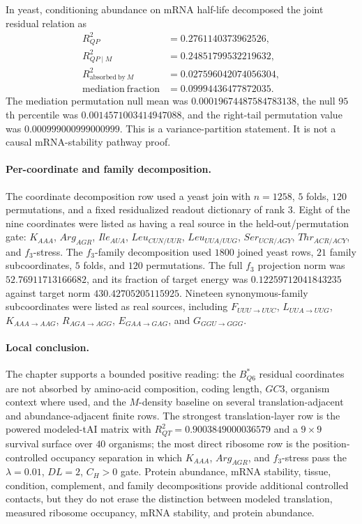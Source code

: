 In yeast, conditioning abundance on mRNA half-life decomposed the joint residual relation as
$$
\begin{aligned}
R^2_{QP} &= 0.2761140373962526,\\
R^2_{QP\mid M} &= 0.24851799532219632,\\
R^2_{\mathrm{absorbed\ by}\ M} &= 0.027596042074056304,\\
\mathrm{mediation\ fraction} &= 0.09994436477872035.
\end{aligned}
$$
The mediation permutation null mean was $0.00019674487584783138$, the null $95$th percentile was $0.0014571003414947088$, and the right-tail permutation value was $0.000999000999000999$.  This is a variance-partition statement.  It is not a causal mRNA-stability pathway proof.

\paragraph{Per-coordinate and family decomposition.}
The coordinate decomposition row used a yeast join with $n=1258$, $5$ folds, $120$ permutations, and a fixed residualized readout dictionary of rank $3$.  Eight of the nine coordinates were listed as having a real source in the held-out/permutation gate: $K_{AAA}$, $Arg_{AGR}$, $Ile_{AUA}$, $Leu_{CUN/UUR}$, $Leu_{UUA/UUG}$, $Ser_{UCR/AGY}$, $Thr_{ACR/ACY}$, and $f_3$-stress.  The $f_3$-family decomposition used $1800$ joined yeast rows, $21$ family subcoordinates, $5$ folds, and $120$ permutations.  The full $f_3$ projection norm was $52.76911713166682$, and its fraction of target energy was $0.12259712041843235$ against target norm $430.42705205115925$.  Nineteen synonymous-family subcoordinates were listed as real sources, including $F_{UUU\to UUC}$, $L_{UUA\to UUG}$, $K_{AAA\to AAG}$, $R_{AGA\to AGG}$, $E_{GAA\to GAG}$, and $G_{GGU\to GGG}$.

\paragraph{Local conclusion.}
The chapter supports a bounded positive reading: the $B^*_{Q6}$ residual coordinates are not absorbed by amino-acid composition, coding length, $GC3$, organism context where used, and the $M$-density baseline on several translation-adjacent and abundance-adjacent finite rows.  The strongest translation-layer row is the powered modeled-tAI matrix with $R^2_{QT}=0.9003849000036579$ and a $9\times 9$ survival surface over $40$ organisms; the most direct ribosome row is the position-controlled occupancy separation in which $K_{AAA}$, $Arg_{AGR}$, and $f_3$-stress pass the $\lambda=0.01$, $DL=2$, $C_H>0$ gate.  Protein abundance, mRNA stability, tissue, condition, complement, and family decompositions provide additional controlled contacts, but they do not erase the distinction between modeled translation, measured ribosome occupancy, mRNA stability, and protein abundance.

